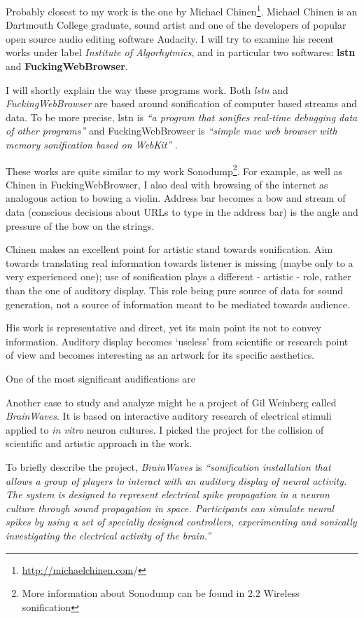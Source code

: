 \documentclass[11pt,a4paper,oneside]{report}
\begin{document}
Probably closest to my work is the one by Michael Chinen\footnote{\url{http://michaelchinen.com}/}. Michael Chinen is an Dartmouth College graduate, sound artist and one of the developers of popular open source audio editing software Audacity.
I will try to examine his recent works under label \emph{Institute of Algorhytmics}, and in particular two softwares: \textbf{lstn} and \textbf{FuckingWebBrowser}.

I will shortly explain the way these programs work. Both \emph{lstn} and \emph{FuckingWebBrowser} are based around sonification of computer based streams and data. To be more precise, lstn is \emph{``a program that sonifies real-time debugging data of other programs''} and FuckingWebBrowser is \emph{``simple mac web browser with memory sonification based on WebKit''} \cite{Chinen}. 

These works are quite similar to my work Sonodump\footnote{More information about Sonodump can be found in 2.2 Wireless sonification}. For example, as well as Chinen in FuckingWebBrowser, I also deal with browsing of the internet as analogous action to bowing a violin. Address bar becomes a bow and stream of data (conscious decisions about URLs to type in the address bar) is the angle and pressure of the bow on the strings. 

Chinen makes an excellent point for artistic stand towards sonification. Aim towards translating real information towards listener is missing (maybe only to a very experienced one); use of sonification plays a different - artistic - role, rather than the one of auditory display. This role being pure source of data for sound generation, not a source of information meant to be mediated towards audience.

His work is representative and direct, yet its main point its not to convey information. Auditory display becomes `useless' from scientific or research point of view and becomes interesting as an artwork for its specific aesthetics.

One of the most significant audifications are 

Another case to study and analyze might be a project of Gil Weinberg called \emph{BrainWaves}. It is based on interactive auditory research of electrical stimuli applied to \emph{in vitro} neuron cultures. I picked the project for the collision of scientific and artistic approach in the work.

To briefly describe the project, \emph{BrainWaves} is \emph{``sonification installation that allows a group of players to interact with an auditory display of neural activity. The system is designed to represent electrical spike propagation in a neuron culture through sound propagation in space. Participants can simulate neural spikes by using a set of specially designed controllers, experimenting and sonically investigating the electrical activity of the brain.''} \cite{Weinberg2006}
\end{document}
